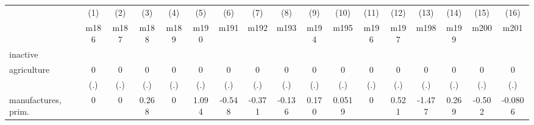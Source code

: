 {
\def\sym#1{\ifmmode^{#1}\else\(^{#1}\)\fi}
\begin{tabular}{l*{16}{c}}
\hline\hline
                    &\multicolumn{1}{c}{(1)}&\multicolumn{1}{c}{(2)}&\multicolumn{1}{c}{(3)}&\multicolumn{1}{c}{(4)}&\multicolumn{1}{c}{(5)}&\multicolumn{1}{c}{(6)}&\multicolumn{1}{c}{(7)}&\multicolumn{1}{c}{(8)}&\multicolumn{1}{c}{(9)}&\multicolumn{1}{c}{(10)}&\multicolumn{1}{c}{(11)}&\multicolumn{1}{c}{(12)}&\multicolumn{1}{c}{(13)}&\multicolumn{1}{c}{(14)}&\multicolumn{1}{c}{(15)}&\multicolumn{1}{c}{(16)}\\
                    &\multicolumn{1}{c}{m186}&\multicolumn{1}{c}{m187}&\multicolumn{1}{c}{m188}&\multicolumn{1}{c}{m189}&\multicolumn{1}{c}{m190}&\multicolumn{1}{c}{m191}&\multicolumn{1}{c}{m192}&\multicolumn{1}{c}{m193}&\multicolumn{1}{c}{m194}&\multicolumn{1}{c}{m195}&\multicolumn{1}{c}{m196}&\multicolumn{1}{c}{m197}&\multicolumn{1}{c}{m198}&\multicolumn{1}{c}{m199}&\multicolumn{1}{c}{m200}&\multicolumn{1}{c}{m201}\\
\hline
inactive            &                     &                     &                     &                     &                     &                     &                     &                     &                     &                     &                     &                     &                     &                     &                     &                     \\
agriculture         &           0         &           0         &           0         &           0         &           0         &           0         &           0         &           0         &           0         &           0         &           0         &           0         &           0         &           0         &           0         &           0         \\
                    &         (.)         &         (.)         &         (.)         &         (.)         &         (.)         &         (.)         &         (.)         &         (.)         &         (.)         &         (.)         &         (.)         &         (.)         &         (.)         &         (.)         &         (.)         &         (.)         \\
[1em]
manufactures, prim. &           0         &           0         &       0.268         &           0         &       1.094         &      -0.548         &      -0.371         &      -0.136         &       0.170         &      0.0519         &           0         &       0.521         &      -1.477         &       0.269         &      -0.502         &     -0.0806         \\

\end{tabular}}

